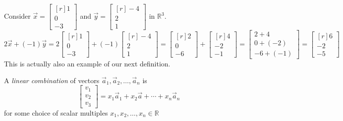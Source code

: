\begin{example}
Consider  $\vec{x}=\begin{bmatrix*}[r]1\\ 0  \\ -3\end{bmatrix*}$ and 
$\vec{y}=\begin{bmatrix*}[r]-4\\ 2 \\ 1\end{bmatrix*}$ in $\mathbb{R}^3$.
\[
2\vec{x}+(-1)\vec{y}=
2\begin{bmatrix*}[r]1\\ 0  \\ -3\end{bmatrix*}+
(-1)\begin{bmatrix*}[r]-4\\ 2 \\ 1\end{bmatrix*}=
\begin{bmatrix*}[r]2\\ 0  \\ -6\end{bmatrix*}+
\begin{bmatrix*}[r]4\\ -2 \\ -1\end{bmatrix*}=
\begin{bmatrix}2+4\\ 0+(-2)  \\ -6+(-1)\end{bmatrix}=
\begin{bmatrix*}[r]6\\ -2  \\ -5\end{bmatrix*}
\]
This is actually also an example of our next definition.
\end{example}
\begin{definition}
A \emph{linear combination} of vectors $\vec{a}_1, \vec{a}_2, \ldots, 
\vec{a}_n$ 
is 
\[
\begin{bmatrix}v_1 \\ v_2 \\ 
v_3\end{bmatrix}=x_1\vec{a}_1+x_2\vec{a}+\cdots+x_n\vec{a}_n
\]  
for some choice of scalar multiples $x_1,x_2, \ldots, x_n \in \mathbb{R}$
\end{definition}


